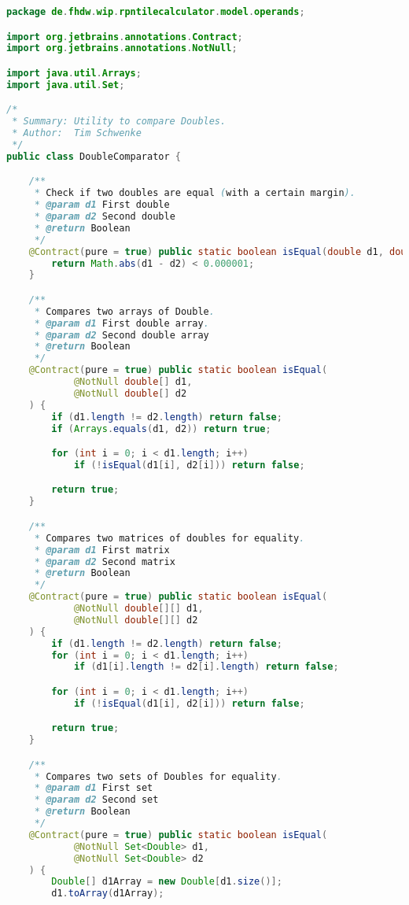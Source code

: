 \begin{lstlisting}[caption=DoubleComparator (Schwenke),label=list:DoubleComparator,language=Java]
package de.fhdw.wip.rpntilecalculator.model.operands;

import org.jetbrains.annotations.Contract;
import org.jetbrains.annotations.NotNull;

import java.util.Arrays;
import java.util.Set;

/*
 * Summary: Utility to compare Doubles.
 * Author:  Tim Schwenke
 */
public class DoubleComparator {

    /**
     * Check if two doubles are equal (with a certain margin).
     * @param d1 First double
     * @param d2 Second double
     * @return Boolean
     */
    @Contract(pure = true) public static boolean isEqual(double d1, double d2) {
        return Math.abs(d1 - d2) < 0.000001;
    }

    /**
     * Compares two arrays of Double.
     * @param d1 First double array.
     * @param d2 Second double array
     * @return Boolean
     */
    @Contract(pure = true) public static boolean isEqual(
            @NotNull double[] d1,
            @NotNull double[] d2
    ) {
        if (d1.length != d2.length) return false;
        if (Arrays.equals(d1, d2)) return true;

        for (int i = 0; i < d1.length; i++)
            if (!isEqual(d1[i], d2[i])) return false;

        return true;
    }

    /**
     * Compares two matrices of doubles for equality.
     * @param d1 First matrix
     * @param d2 Second matrix
     * @return Boolean
     */
    @Contract(pure = true) public static boolean isEqual(
            @NotNull double[][] d1,
            @NotNull double[][] d2
    ) {
        if (d1.length != d2.length) return false;
        for (int i = 0; i < d1.length; i++)
            if (d1[i].length != d2[i].length) return false;

        for (int i = 0; i < d1.length; i++)
            if (!isEqual(d1[i], d2[i])) return false;

        return true;
    }

    /**
     * Compares two sets of Doubles for equality.
     * @param d1 First set
     * @param d2 Second set
     * @return Boolean
     */
    @Contract(pure = true) public static boolean isEqual(
            @NotNull Set<Double> d1,
            @NotNull Set<Double> d2
    ) {
        Double[] d1Array = new Double[d1.size()];
        d1.toArray(d1Array);


\end{lstlisting}
